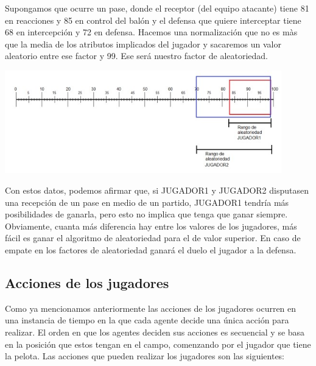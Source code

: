 \documentclass{article}
\begin{document}
Supongamos que ocurre un pase, donde el receptor (del equipo atacante) tiene 81 en reacciones y 85 en control del 
balón y el defensa que quiere interceptar tiene 68 en intercepción y 72 en defensa. Hacemos una normalización que 
no es màs que la media de los atributos implicados del jugador y sacaremos un valor aleatorio entre ese factor y 99. 
Ese será nuestro factor de aleatoriedad.


\includegraphics*[width=0.9\textwidth]{images/rank.jpg}
\bigskip

Con estos datos, podemos afirmar que, si JUGADOR1 y JUGADOR2 disputasen una recepción de un pase en medio de un 
partido, JUGADOR1 tendría más posibilidades de ganarla, pero esto no implica que tenga que ganar siempre.
Obviamente, cuanta más diferencia hay entre los valores de los jugadores, más fácil es ganar el algoritmo de 
aleatoriedad para el de valor superior. En caso de empate en los factores de aleatoriedad ganará el duelo el 
jugador a la defensa.

\subsection{Acciones de los jugadores}

Como ya mencionamos anteriormente las acciones de los jugadores ocurren en una instancia de tiempo en la que cada agente decide 
una única acción para realizar. El orden en que los agentes deciden sus acciones es secuencial y se basa en la posición que estos tengan en el campo,
comenzando por el jugador que tiene la pelota. Las acciones que pueden realizar los jugadores son las siguientes:
\end{document}
